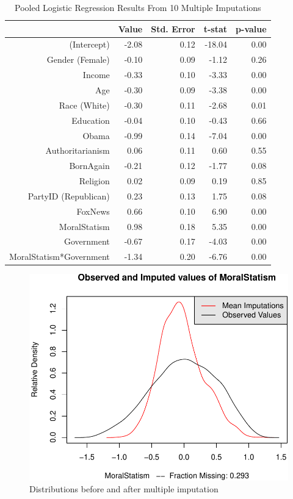 \documentclass[12pt,]{article}
\begin{document}
\begin{table}[ht]
\centering
\begin{tabular}{rrrrr}
  \hline
 & Value & Std. Error & t-stat & p-value \\ 
  \hline
(Intercept) & -2.08 & 0.12 & -18.04 & 0.00 \\ 
  Gender (Female) & -0.10 & 0.09 & -1.12 & 0.26 \\ 
  Income & -0.33 & 0.10 & -3.33 & 0.00 \\ 
  Age & -0.30 & 0.09 & -3.38 & 0.00 \\ 
  Race (White) & -0.30 & 0.11 & -2.68 & 0.01 \\ 
  Education & -0.04 & 0.10 & -0.43 & 0.66 \\ 
  Obama & -0.99 & 0.14 & -7.04 & 0.00 \\ 
  Authoritarianism & 0.06 & 0.11 & 0.60 & 0.55 \\ 
  BornAgain & -0.21 & 0.12 & -1.77 & 0.08 \\ 
  Religion & 0.02 & 0.09 & 0.19 & 0.85 \\ 
  PartyID (Republican) & 0.23 & 0.13 & 1.75 & 0.08 \\ 
  FoxNews & 0.66 & 0.10 & 6.90 & 0.00 \\ 
  MoralStatism & 0.98 & 0.18 & 5.35 & 0.00 \\ 
  Government & -0.67 & 0.17 & -4.03 & 0.00 \\ 
  MoralStatism*Government & -1.34 & 0.20 & -6.76 & 0.00 \\ 
   \hline
\end{tabular}
\caption{Pooled Logistic Regression Results From 10 Multiple Imputations} 
\end{table}

\clearpage

\begin{figure}[htbp]
\centering
\includegraphics{figures/missing2-1.pdf}
\caption{Distributions before and after multiple imputation}
\end{figure}
\end{document}
